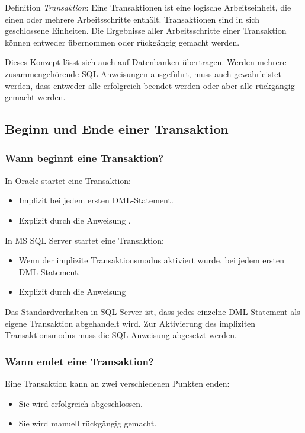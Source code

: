 \begin{merke}
    Definition \textit{Transaktion}: Eine Transaktionen ist eine logische
    Arbeitseinheit, die einen oder mehrere Arbeitsschritte enthält.
    Transaktionen sind in sich geschlossene Einheiten. Die Ergebnisse aller
    Arbeitsschritte einer Transaktion können entweder übernommen oder
    rückgängig gemacht werden.
\end{merke}
Dieses Konzept lässt sich auch auf Datenbanken übertragen. Werden
mehrere zusammengehörende SQL-Anweisungen ausgeführt, muss auch
gewährleistet werden, dass entweder alle erfolgreich beendet werden oder
aber alle rückgängig gemacht werden.
\subsection{Beginn und Ende einer Transaktion}
\subsubsection{Wann beginnt eine Transaktion?}
In Oracle startet eine Transaktion:
\begin{itemize}
    \item Implizit bei jedem ersten DML-Statement.
    \item Explizit durch die Anweisung .
\end{itemize}
In MS SQL Server startet eine Transaktion:
\begin{itemize}
    \item Wenn der implizite Transaktionsmodus aktiviert wurde, bei
          jedem ersten DML-State\-ment.
    \item Explizit durch die Anweisung 
\end{itemize}
\begin{merke}
    Das Standardverhalten in SQL Server ist, dass jedes einzelne
    DML-Statement als eigene Transaktion abgehandelt wird. Zur
    Ak\-ti\-vie\-rung des impliziten Transaktionsmodus muss die
    SQL-Anweisung  abgesetzt
    werden.
\end{merke}
\subsubsection{Wann endet eine Transaktion?}
Eine Transaktion kann an zwei verschiedenen Punkten enden:
\begin{itemize}
    \item Sie wird erfolgreich abgeschlossen.
    \item Sie wird manuell rückgängig gemacht.
\end{itemize}
